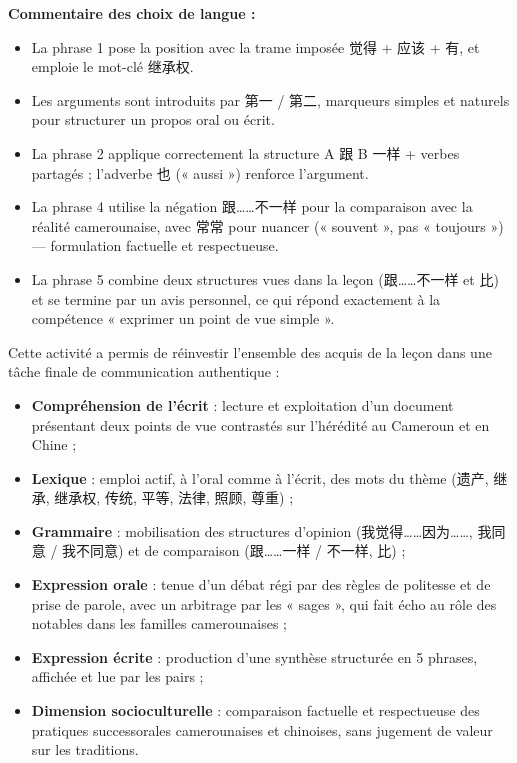 \documentclass[11pt]{article}
\newcounter{popsec}
\newcounter{popsub}
\newcommand{\courssub}[1]{%
  \stepcounter{popsub}%
  \par\vspace{9pt}\noindent{\popxbold\fontsize{11.5}{13}\selectfont\color{popink}{\color{poporange}\thepopsec.\thepopsub}\hspace{6pt}#1}\par\nopagebreak\vspace{4pt}
}
\begin{document}
\begin{exoresolu}
\textbf{Commentaire des choix de langue :}
\begin{itemize}
\item La phrase 1 pose la position avec la trame imposée 觉得 + 应该 + 有, et emploie le mot-clé 继承权.
\item Les arguments sont introduits par 第一 / 第二, marqueurs simples et naturels pour structurer un propos oral ou écrit.
\item La phrase 2 applique correctement la structure A 跟 B 一样 + verbes partagés ; l'adverbe 也 (« aussi ») renforce l'argument.
\item La phrase 4 utilise la négation 跟……不一样 pour la comparaison avec la réalité camerounaise, avec 常常 pour nuancer (« souvent », pas « toujours ») — formulation factuelle et respectueuse.
\item La phrase 5 combine deux structures vues dans la leçon (跟……不一样 et 比) et se termine par un avis personnel, ce qui répond exactement à la compétence « exprimer un point de vue simple ».
\end{itemize}
\end{exoresolu}

\courssub{Bilan de l'activité}

Cette activité a permis de réinvestir l'ensemble des acquis de la leçon dans une tâche finale de communication authentique :
\begin{itemize}
\item \textbf{Compréhension de l'écrit} : lecture et exploitation d'un document présentant deux points de vue contrastés sur l'hérédité au Cameroun et en Chine ;
\item \textbf{Lexique} : emploi actif, à l'oral comme à l'écrit, des mots du thème (遗产, 继承, 继承权, 传统, 平等, 法律, 照顾, 尊重) ;
\item \textbf{Grammaire} : mobilisation des structures d'opinion (我觉得……因为……, 我同意 / 我不同意) et de comparaison (跟……一样 / 不一样, 比) ;
\item \textbf{Expression orale} : tenue d'un débat régi par des règles de politesse et de prise de parole, avec un arbitrage par les « sages », qui fait écho au rôle des notables dans les familles camerounaises ;
\item \textbf{Expression écrite} : production d'une synthèse structurée en 5 phrases, affichée et lue par les pairs ;
\item \textbf{Dimension socioculturelle} : comparaison factuelle et respectueuse des pratiques successorales camerounaises et chinoises, sans jugement de valeur sur les traditions.
\end{itemize}
\end{document}

